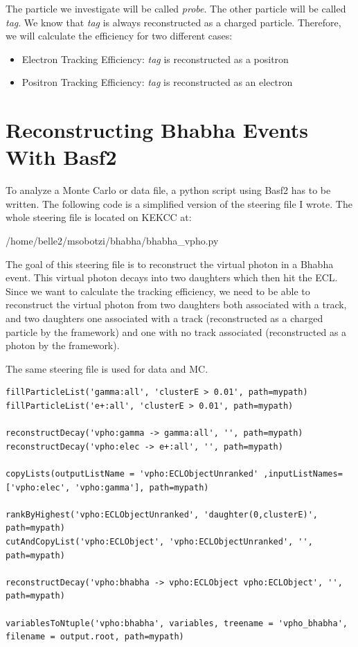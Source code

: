 \documentclass[a4paper,11pt,twosided,final,german,openbib,pdftex,listof=totoc,bibliography=totoc]{scrbook}
\begin{document}
The particle we investigate will be called \textit{probe}. The other particle will be called \textit{tag}. We know that \textit{tag} is always reconstructed as a charged particle. Therefore, we will calculate the efficiency for two different cases:

\begin{itemize}
	
	\item Electron Tracking Efficiency: \textit{tag} is reconstructed as a positron
	\item Positron Tracking Efficiency: \textit{tag} is reconstructed as an electron
\end{itemize}

\section{Reconstructing Bhabha Events With Basf2}
\label{sec:RecBasf2}


To analyze a Monte Carlo or data file, a python script using Basf2 has to be written. The following code is a simplified version of the steering file I wrote. 
The whole steering file is located on KEKCC at:


/home/belle2/msobotzi/bhabha/bhabha\_vpho.py
\newline


The goal of this steering file is to reconstruct the virtual photon in a Bhabha event. This virtual photon decays into two daughters which then hit the ECL. Since we want to calculate the tracking efficiency, we need to be able to reconstruct the virtual photon from two daughters both associated with a track, and two daughters one associated with a track (reconstructed as a charged particle by the framework) and one with no track associated (reconstructed as a photon by the framework).

The same steering file is used for data and MC.
\newline 


{\small
\begin{lstlisting}
fillParticleList('gamma:all', 'clusterE > 0.01', path=mypath)
fillParticleList('e+:all', 'clusterE > 0.01', path=mypath)

reconstructDecay('vpho:gamma -> gamma:all', '', path=mypath)
reconstructDecay('vpho:elec -> e+:all', '', path=mypath)

copyLists(outputListName = 'vpho:ECLObjectUnranked' ,inputListNames=['vpho:elec', 'vpho:gamma'], path=mypath)

rankByHighest('vpho:ECLObjectUnranked', 'daughter(0,clusterE)', path=mypath)
cutAndCopyList('vpho:ECLObject', 'vpho:ECLObjectUnranked', '', path=mypath)
	
reconstructDecay('vpho:bhabha -> vpho:ECLObject vpho:ECLObject', '', path=mypath)

variablesToNtuple('vpho:bhabha', variables, treename = 'vpho_bhabha', filename = output.root, path=mypath)
	
\end{lstlisting}
}
\bigskip
\end{document}
